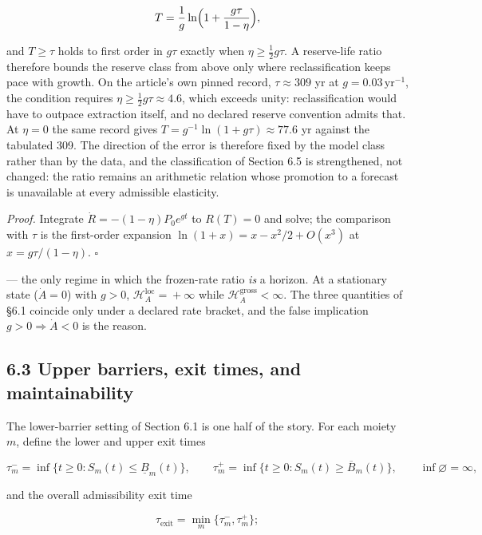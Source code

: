 \documentclass[11pt]{article}
\begin{document}
$$T=\frac1g\ln\Bigl(1+\frac{g\tau}{1-\eta}\Bigr),$$

 and \(T\ge\tau\) holds to first order in \(g\tau\) exactly when \(\eta\ge\tfrac12g\tau\). A reserve-life ratio therefore bounds the reserve class from above only where reclassification keeps pace with growth. On the article's own pinned record, \(\tau\approx309\) yr at \(g=0.03\,\mathrm{yr}^{-1}\), the condition requires \(\eta\ge\tfrac12g\tau\approx4.6\), which exceeds unity: reclassification would have to outpace extraction itself, and no declared reserve convention admits that. At \(\eta=0\) the same record gives \(T=\allowbreak{}g^{-1}\ln(1+\allowbreak{}g\tau)\approx77.6\) yr against the tabulated 309. The direction of the error is therefore fixed by the model class rather than by the data, and the classification of Section 6.5 is strengthened, not changed: the ratio remains an arithmetic relation whose promotion to a forecast is unavailable at every admissible elasticity.

\emph{Proof.} Integrate \(\dot R=-(1-\eta)P_0e^{gt}\) to \(R(T)=0\) and solve; the comparison with \(\tau\) is the first-order expansion \(\ln(1+\allowbreak{}x)=\allowbreak{}x-x^2/\allowbreak{}2+\allowbreak{}O(x^3)\) at \(x=g\tau/(1-\eta)\). \(\square\)

--- the only regime in which the frozen-rate ratio \emph{is} a horizon. At a stationary state (\(\dot A=0\)) with \(g>0\), \(\mathcal H^{\mathrm{loc}}_A=\allowbreak{}+\allowbreak{}\infty\) while \(\mathcal H^{\mathrm{gross}}_A<\infty\). The three quantities of \S6.1 coincide only under a declared rate bracket, and the false implication \(g>0\Rightarrow\dot A<0\) is the reason.

\subsection*{6.3 Upper barriers, exit times, and maintainability}\label{63-upper-barriers-exit-times-and-maintainability}

The lower-barrier setting of Section 6.1 is one half of the story. For each moiety \(m\), define the lower and upper exit times 

$$\tau_m^- = \inf\{ t \ge 0 : S_m(t) \le \underline{B}_m(t) \}, \qquad \tau_m^+ = \inf\{ t \ge 0 : S_m(t) \ge \overline{B}_m(t) \}, \qquad \inf\varnothing = \infty,$$

 and the overall admissibility exit time 

$$\tau_{\mathrm{exit}} = \min_m \{ \tau_m^-, \tau_m^+ \};$$
\end{document}

